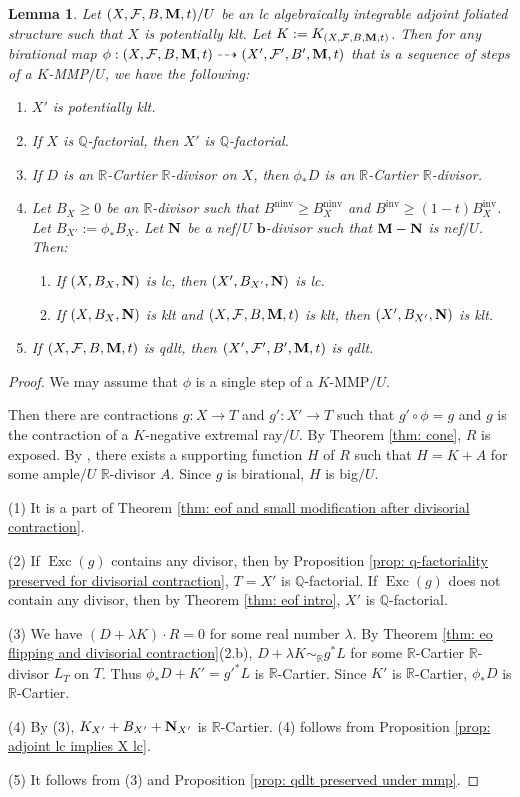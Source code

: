 \documentclass[12pt]{amsart}
\numberwithin{equation}{section}
\newcommand{\bb}{\bm{b}}
\newcommand{\Mm}{{\bf{M}}}
\newcommand{\Nn}{{\bf{N}}}
\newcommand{\Qq}{\mathbb{Q}}
\newcommand{\Rr}{\mathbb{R}}
\newcommand{\Exc}{\operatorname{Exc}}
\newcommand{\ninv}{\operatorname{ninv}}
\newcommand{\inv}{\operatorname{inv}}
\newcommand{\Ff}{\mathcal{F}}
\newtheorem{lem}[thm]{Lemma}
\theoremstyle{definition}
\theoremstyle{definition}
\theoremstyle{definition}
\begin{document}
\begin{lem}\label{lem: properties preserved under mmp}
Let $(X,\Ff,B,\Mm,t)/U$ be an lc algebraically integrable adjoint foliated structure such that $X$ is potentially klt. Let $K:=K_{(X,\Ff,B,\Mm,t)}$. Then for any birational map $\phi: (X,\Ff,B,\Mm,t)\dashrightarrow (X',\Ff',B',\Mm,t)$ that is a sequence of steps of a $K$-MMP$/U$, we have the following:
\begin{enumerate}
    \item $X'$ is potentially klt.
    \item If $X$ is $\Qq$-factorial, then $X'$ is $\Qq$-factorial.
    \item If $D$ is an $\Rr$-Cartier $\Rr$-divisor on $X$, then $\phi_\ast D$ is an $\Rr$-Cartier $\Rr$-divisor.
    \item Let $B_X\geq 0$ be an $\Rr$-divisor such that $B^{\ninv}\geq B_X^{\ninv}$ and $B^{\inv}\geq (1-t)B_X^{\inv}$. Let $B_{X'}:=\phi_\ast B_X$. Let $\Nn$ be a nef$/U$ $\bb$-divisor such that $\Mm-\Nn$ is nef$/U$. Then:
    \begin{enumerate}
     \item If $(X,B_X,\Nn)$ is lc, then $(X',B_{X'},\Nn)$ is lc.
     \item If $(X,B_X,\Nn)$ is klt and $(X,\Ff,B,\Mm,t)$ is klt, then $(X',B_{X'},\Nn)$ is klt.
    \end{enumerate}
    \item If $(X,\Ff,B,\Mm,t)$ is qdlt, then $(X',\Ff',B',\Mm,t)$ is qdlt.
\end{enumerate}
\end{lem}
\begin{proof}
We may assume that $\phi$ is a single step of a $K$-MMP$/U$.


Then there are contractions $g: X\rightarrow T$ and $g': X'\rightarrow T$ such that $g'\circ\phi=g$ and $g$ is the contraction of a $K$-negative extremal ray$/U$. By Theorem \ref{thm: cone}, $R$ is exposed. By \cite[Lemma 8.4.1]{CHLX23}, there exists a supporting function $H$ of $R$ such that $H=K+A$ for some ample$/U$ $\Rr$-divisor $A$. Since $g$ is birational, $H$ is big$/U$.

(1) It is a part of Theorem \ref{thm: eof and small modification after divisorial contraction}.

(2) If $\Exc(g)$ contains any divisor, then by Proposition \ref{prop: q-factoriality preserved for divisorial contraction}, $T=X'$ is $\Qq$-factorial. If $\Exc(g)$ does not contain any divisor, then by Theorem \ref{thm: eof intro}, $X'$ is $\Qq$-factorial.

(3) We have $(D+\lambda K)\cdot R=0$ for some real number $\lambda$. By Theorem \ref{thm: eo flipping and divisorial contraction}(2.b), $D+\lambda K\sim_{\mathbb R}g^\ast L$ for some $\Rr$-Cartier $\Rr$-divisor $L_T$ on $T$. Thus $\phi_\ast D+K'=g'^\ast L$ is $\Rr$-Cartier. Since $K'$ is $\Rr$-Cartier, $\phi_\ast D$ is $\Rr$-Cartier.

(4) By (3), $K_{X'}+B_{X'}+\Nn_{X'}$ is $\Rr$-Cartier. (4) follows from Proposition \ref{prop: adjoint lc implies X lc}.

(5) It follows from (3) and Proposition \ref{prop: qdlt preserved under mmp}.
\end{proof}
\end{document}
